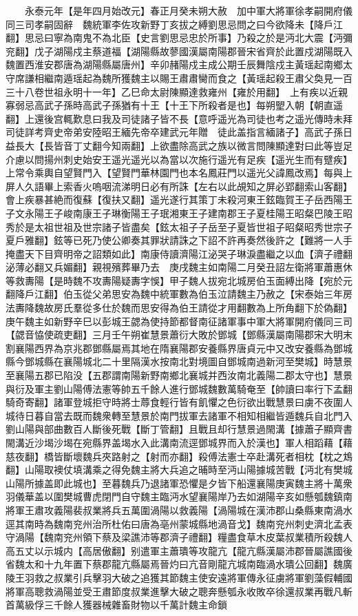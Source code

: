 　　永泰元年【是年四月始改元】春正月癸未朔大赦　加中軍大將軍徐孝嗣開府儀同三司孝嗣固辭　魏統軍李佐攻新野丁亥拔之縛劉思忌問之曰今欲降未【降戶江翻】思忌曰寧為南鬼不為北臣【史言劉思忌忠於所事】乃殺之於是沔北大震【沔彌兖翻】戊子湖陽戍主蔡道福【湖陽縣故蓼國漢屬南陽郡晉宋省齊於此置戍湖陽既入魏置西淮安郡唐為湖陽縣屬唐州】辛卯赭陽戍主成公期壬辰舞陰戍主黃瑶起南鄉太守席謙相繼南遁瑶起為魏所獲魏主以賜王肅肅臠而食之【黃瑶起殺王肅父奐見一百三十八卷世祖永明十一年】乙巳命太尉陳顯達救雍州【雍於用翻】　上有疾以近親寡弱忌高武子孫時高武子孫猶有十王【十王下所殺者是也】每朔朢入朝【朝直遥翻】上還後宫輒歎息曰我及司徒諸子皆不長【意呼遥光為司徒也考之遥光傳時未拜司徒詳考齊史帝弟安陸昭王緬先帝卒建武元年贈　徒此盖指言緬諸子】高武子孫日益長大【長皆音丁丈翻今知兩翻】上欲盡除高武之族以微言問陳顯達對曰此等豈足介慮以問揚州刺史始安王遥光遥光以為當以次施行遥光有足疾【遥光生而有躄疾】上常令乘輿自望賢門入【望賢門華林園門也本名鳳莊門以遥光父諱鳳改焉】每與上屏人久語畢上索香火嗚咽流涕明日必有所誅【左右以此覘知之屏必郢翻索山客翻】會上疾暴甚絶而復蘇【復扶又翻】遥光遂行其策丁未殺河東王鉉臨賀王子岳西陽王子文永陽王子峻南康王子琳衡陽王子珉湘東王子建南郡王子夏桂陽王昭粲巴陵王昭秀於是太祖世祖及世宗諸子皆盡矣【鉉太祖子子岳至子夏皆世祖子昭粲昭秀世宗子夏戶雅翻】鉉等已死乃使公卿奏其罪狀請誅之下詔不許再奏然後許之【難將一人手掩盡天下目齊明帝之詔類如此】南康侍讀濟陽江泌哭子琳淚盡繼之以血【濟子禮翻泌薄必翻又兵媚翻】親視殯葬畢乃去　庚戌魏主如南陽二月癸丑詔左衛將軍蕭惠休等救夀陽【是時魏不攻夀陽疑夀字悞】甲子魏人拔宛北城房伯玉面縛出降【宛於元翻降戶江翻】伯玉從父弟思安為魏中統軍數為伯玉泣請魏主乃赦之【宋泰始三年房法夀降魏故房氏羣從多仕於魏而思安得為伯王請從才用翻數為上所角翻下於偽翻】庚午魏主如新野辛巳以彭城王勰為使持節都督南征諸軍事中軍大將軍開府儀同三司【勰音恊使疏吏翻】三月壬午朔崔慧景蕭衍大敗於鄧城【鄧縣漢屬南陽郡宋大明末割襄陽西界為京兆郡鄧縣屬焉其地在隋襄陽郡安養縣界唐貞元中又改安養縣為鄧城縣今鄧城縣在襄陽城北二十里隔漢水按南北對境圖自鄧城南過新河至樊城】時慧景至襄陽五郡已陷没【五郡謂南陽新野南鄉北襄城并西汝南北義陽二郡太守也】慧景與衍及軍主劉山陽傅法憲等帥五千餘人進行鄧城魏數萬騎奄至【帥讀曰率行下孟翻騎奇寄翻】諸軍登城拒守時將士蓐食輕行皆有飢懼之色衍欲出戰慧景曰虜不夜圍人城待日暮自當去既而魏衆轉至慧景於南門拔軍去諸軍不相知相繼皆遁魏兵自北門入劉山陽與部曲數百人斷後死戰【斷丁管翻】且戰且却行慧景過閙溝【據蕭子顯齊書閙溝近沙堨沙堨在宛縣界盖堨水入此溝南流逕鄧城界而入於漢也】軍人相蹈藉【藉慈夜翻】橋皆斷壞魏兵夾路射之【射而亦翻】殺傅法憲士卒赴溝死者相枕【枕之鴆翻】山陽取襖仗填溝乘之得免魏主將大兵追之晡時至沔山陽據城苦戰【沔北有樊城山陽所據盖即此城也】至暮魏兵乃退諸軍恐懼是夕皆下船還襄陽庚寅魏主將十萬衆羽儀華盖以圍樊城曹虎閉門自守魏主臨沔水望襄陽岸乃去如湖陽辛亥如懸瓠魏鎮南將軍王肅攻義陽裴叔業將兵五萬圍渦陽以救義陽【渦陽城在漢沛郡山桑縣東南渦水逕其南時為魏南兖州治所杜佑曰唐為亳州蒙城縣地渦音戈】魏南兖州刺史濟北孟表守渦陽【魏南兖州領下蔡及梁譙沛等郡濟子禮翻】糧盡食草木皮葉叔業積所殺魏人高五丈以示城内【高居傲翻】别遣軍主蕭璝等攻龍亢【龍亢縣漢屬沛郡晉屬譙國後省魏太和十九年置下蔡郡龍亢縣屬焉晉灼曰亢音剛龍亢城南臨渦水璝公回翻】魏廣陵王羽救之叔業引兵擊羽大破之追獲其節魏主使安遠將軍傳永征虜將軍劉藻假輔國將軍高聰救渦陽並受王肅節度叔業進擊大破之聰奔懸瓠永收敗卒徐還叔業再戰凡斬首萬級俘三千餘人獲器械雜畜財物以千萬計魏主命鎖